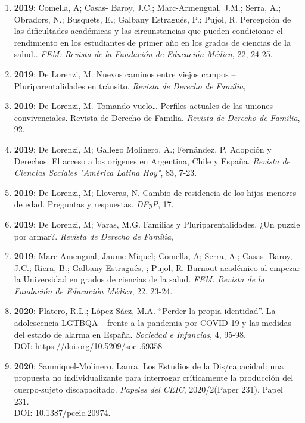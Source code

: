 \begin{enumerate}
\item {\bf 2019}: Comella, A; Casas- Baroy, J.C.; Marc-Armengual, J.M.; Serra, A.; Obradors, N.; Busquets, E.; Galbany Estragués, P.; Pujol, R.  Percepción de las dificultades académicas y las circunstancias que pueden condicionar el rendimiento en los estudiantes de primer año en los grados de ciencias de la salud.. {\it FEM: Revista de la Fundación de Educación Médica}, 22, 24-25.  \filbreak
\item {\bf 2019}: De Lorenzi, M.  Nuevos caminos entre viejos campos – Pluriparentalidades en tránsito. {\it Revista de Derecho de Familia},  \filbreak
\item {\bf 2019}: De Lorenzi, M.  Tomando vuelo… Perfiles actuales de las uniones convivenciales. Revista de Derecho de Familia. {\it Revista de Derecho de Familia}, 92.  \filbreak
\item {\bf 2019}: De Lorenzi, M; Gallego Molinero, A.; Fernández, P.  Adopción y Derechos. El acceso a los orígenes en Argentina, Chile y España. {\it Revista de Ciencias Sociales "América Latina Hoy"}, 83, 7-23.  \filbreak
\item {\bf 2019}: De Lorenzi, M; Lloveras, N.  Cambio de residencia de los hijos menores de edad. Preguntas y respuestas. {\it DFyP}, 17.  \filbreak
\item {\bf 2019}: De Lorenzi, M; Varas, M.G.  Familias y Pluriparentalidades. ¿Un puzzle por armar?. {\it Revista de Derecho de Familia},  \filbreak
\item {\bf 2019}: Marc-Amengual, Jaume-Miquel; Comella, A; Serra, A.; Casas- Baroy, J.C.; Riera, B.; Galbany Estragués, ; Pujol, R.  Burnout académico al empezar la Universidad en grados de ciencias de la salud. {\it FEM: Revista de la Fundación de Educación Médica}, 22, 23-24.  \filbreak
\item {\bf 2020}: Platero, R.L.; López-Sáez, M.A.  “Perder la propia identidad”. La adolescencia LGTBQA+ frente a la pandemia por COVID-19 y las medidas del estado de alarma en España. {\it Sociedad e Infancias}, 4, 95-98.  \\ DOI: https://doi.org/10.5209/soci.69358%
\item {\bf 2020}: Sanmiquel-Molinero, Laura.  Los Estudios de la Dis/capacidad: una propuesta no individualizante para interrogar críticamente la producción del cuerpo-sujeto discapacitado. {\it Papeles del CEIC}, 2020/2(Paper 231), Papel 231.  \\ DOI: 10.1387/pceic.20974. \filbreak

\end{enumerate}
